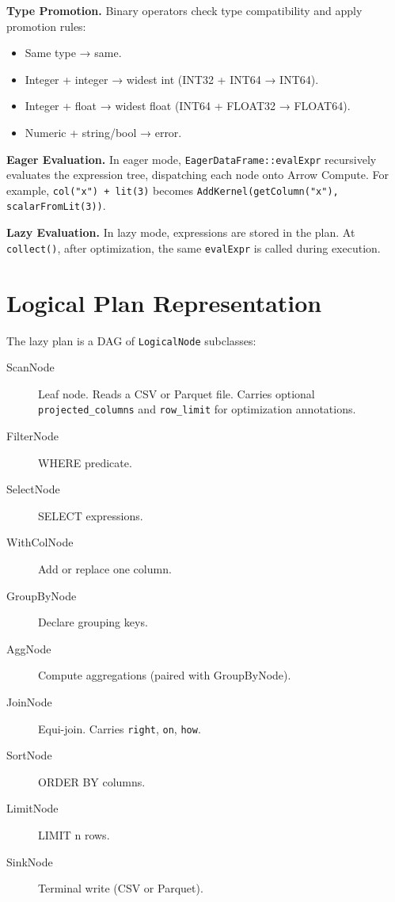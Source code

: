 \documentclass[11pt]{article}
\begin{document}
\textbf{Type Promotion.} Binary operators check type compatibility and apply 
promotion rules:
\begin{itemize}
  \item Same type → same.
  \item Integer + integer → widest int (INT32 + INT64 → INT64).
  \item Integer + float → widest float (INT64 + FLOAT32 → FLOAT64).
  \item Numeric + string/bool → error.
\end{itemize}

\textbf{Eager Evaluation.} In eager mode, \texttt{EagerDataFrame::evalExpr} 
recursively evaluates the expression tree, dispatching each node onto 
Arrow Compute. For example, \texttt{col("x") + lit(3)} becomes 
\texttt{AddKernel(getColumn("x"), scalarFromLit(3))}.

\textbf{Lazy Evaluation.} In lazy mode, expressions are stored in the plan. 
At \texttt{collect()}, after optimization, the same \texttt{evalExpr} is 
called during execution.

\section{Logical Plan Representation}

The lazy plan is a DAG of \texttt{LogicalNode} subclasses:

\begin{description}
  \item[ScanNode] Leaf node. Reads a CSV or Parquet file. Carries optional 
    \texttt{projected\_columns} and \texttt{row\_limit} for optimization 
    annotations.
  \item[FilterNode] WHERE predicate.
  \item[SelectNode] SELECT expressions.
  \item[WithColNode] Add or replace one column.
  \item[GroupByNode] Declare grouping keys.
  \item[AggNode] Compute aggregations (paired with GroupByNode).
  \item[JoinNode] Equi-join. Carries \texttt{right}, \texttt{on}, \texttt{how}.
  \item[SortNode] ORDER BY columns.
  \item[LimitNode] LIMIT n rows.
  \item[SinkNode] Terminal write (CSV or Parquet).
\end{description}
\end{document}
